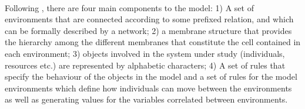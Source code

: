 
\begin{table}
\small %
		\caption[Description of model parameters] %
				{Parameters and definitions used in the model.   
} 
		
		\label{tab:param_desc}
	\end{table}


	
\newpage
{} \\
Following \cite{colomer2013population}, there are four main components to the model:  1) A set of environments that are connected according to some prefixed relation, and which can be formally described by a network; 2) a membrane structure that provides the hierarchy among the different membranes that constitute the cell contained in each environment; 3) objects involved in the system under study (individuals, resources etc.) are represented by alphabetic characters; 4) A set of rules that specify the behaviour of the objects in the model and a set of rules for the model environments which define how individuals can move between the environments as well as generating values for the variables correlated between environments.

\newpage

	\newpage

\newpage

	\newpage


